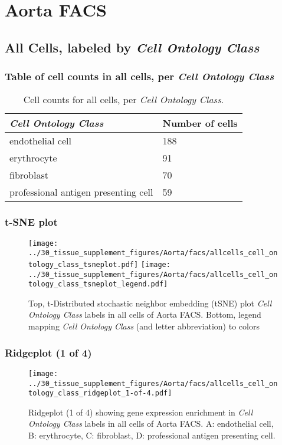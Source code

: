 \clearpage
\section{Aorta FACS}

\subsection{All Cells, labeled by \emph{Cell Ontology Class}}
\subsubsection{Table of cell counts in all cells, per \emph{Cell Ontology Class}}\begin{table}[h]
\centering
\label{my-label}
\begin{tabular}{@{}ll@{}}
\toprule

\emph{Cell Ontology Class}& Number of cells \\ \midrule
endothelial cell & 188 \\

erythrocyte & 91 \\

fibroblast & 70 \\

professional antigen presenting cell & 59 \\
\bottomrule
\end{tabular}
\caption{Cell counts for all cells, per \emph{Cell Ontology Class}.}
\end{table}

\clearpage
\subsubsection{t-SNE plot}
\begin{figure}[h]
\centering
\texttt{[image: ../30\_tissue\_supplement\_figures/Aorta/facs/allcells\_cell\_ontology\_class\_tsneplot.pdf]}
\texttt{[image: ../30\_tissue\_supplement\_figures/Aorta/facs/allcells\_cell\_ontology\_class\_tsneplot\_legend.pdf]}
\caption{Top, t-Distributed stochastic neighbor embedding (tSNE) plot  \emph{Cell Ontology Class} labels in all cells of Aorta FACS. Bottom, legend mapping \emph{Cell Ontology Class} (and letter abbreviation) to colors}
\end{figure}


\clearpage

\subsubsection{Ridgeplot (1 of 4)}
\begin{figure}[h]
\centering
\texttt{[image: ../30\_tissue\_supplement\_figures/Aorta/facs/allcells\_cell\_ontology\_class\_ridgeplot\_1-of-4.pdf]}

\caption{ Ridgeplot (1 of 4)  showing gene expression enrichment in \emph{Cell Ontology Class} labels in all cells of Aorta FACS. A: endothelial cell, B: erythrocyte, C: fibroblast, D: professional antigen presenting cell.}
\end{figure}


